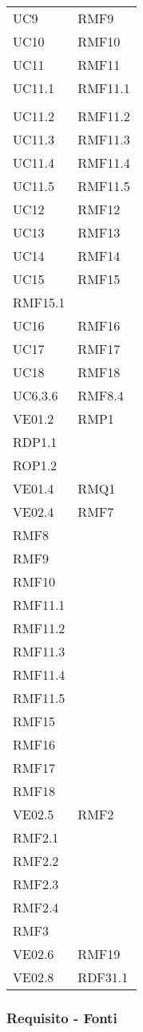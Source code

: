\begin{longtable}[h!] { >{\centering}m{5cm} >{\centering}m{5cm} }
	 \tabularnewline
	 UC9 & RMF9
	 \tabularnewline
	 UC10 & RMF10
	 \tabularnewline
	 UC11 & RMF11
	 \tabularnewline
	 UC11.1 & RMF11.1 \\ 
	 \tabularnewline
	 UC11.2 & RMF11.2
	 \tabularnewline
	 UC11.3 & RMF11.3
	 \tabularnewline
	 UC11.4 & RMF11.4
	 \tabularnewline
	 UC11.5 & RMF11.5
	 \tabularnewline
	 UC12 & RMF12
	 \tabularnewline
	 UC13 & RMF13
	 \tabularnewline
	 UC14 & RMF14
	 \tabularnewline
	 UC15 & RMF15 \\
	 RMF15.1
	 \tabularnewline
	 UC16 & RMF16
	 \tabularnewline
	 UC17 & RMF17
	 \tabularnewline
	 UC18 & RMF18
	 \tabularnewline
	 UC6.3.6 & RMF8.4
	 \tabularnewline
	 VE01.2 & RMP1 \\
	 RDP1.1 \\
	 ROP1.2 
	 \tabularnewline
	 VE01.4 & RMQ1
	 \tabularnewline
	 VE02.4 & RMF7\\
	 RMF8 \\
	 RMF9 \\
	 RMF10 \\
	 RMF11.1 \\
	 RMF11.2 \\
	 RMF11.3 \\
	 RMF11.4 \\
	 RMF11.5 \\
	 RMF15 \\
	 RMF16 \\
	 RMF17 \\
	 RMF18 
	 \tabularnewline
	 VE02.5 & RMF2 \\
	 RMF2.1 \\
	 RMF2.2 \\
	 RMF2.3 \\
	 RMF2.4 \\
	 RMF3
	 \tabularnewline
	 VE02.6 & RMF19
	 \tabularnewline
	 VE02.8 & RDF31.1
	 \tabularnewline
	
\end{longtable}

\newpage

\subsubsection{Requisito - Fonti}

